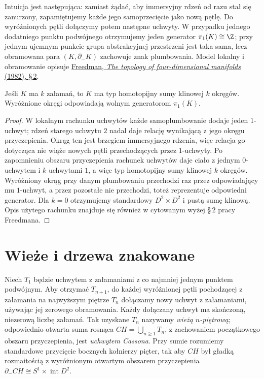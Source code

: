 Intuicja jest następująca: zamiast żądać, aby
immersyjny rdzeń od razu stał się zanurzony, zapamiętujemy
każde jego samoprzecięcie jako nową pętlę. Do
wyróżnionych pętli dołączymy potem następne uchwyty.
W przypadku jednego dodatniego punktu podwójnego
otrzymujemy jeden generator $\pi_1(K)\cong\Z$;
przy jednym ujemnym punkcie grupa abstrakcyjnej
przestrzeni jest taka sama, lecz obramowana para
$(K,\partial_-K)$ zachowuje znak plumbowania.
Model lokalny i obramowanie opisuje
\href{https://www.maths.gla.ac.uk/~mpowell/1982_The%20topology%20of%20four-dimensional%20manifolds.pdf}
{Freedman, \emph{The topology of four-dimensional manifolds}
(1982), \S\,2}.

\begin{stwierdzenie}
\label{prop:casson-first-pi1}
Jeśli $K$ ma $k$ załamań, to $K$ ma typ homotopijny
sumy klinowej $k$ okręgów. Wyróżnione okręgi
odpowiadają wolnym generatorom $\pi_1(K)$.
\end{stwierdzenie}
\begin{proof}
W lokalnym rachunku uchwytów każde
samoplumbowanie dodaje jeden $1$-uchwyt; rdzeń starego
uchwytu $2$ nadal daje relację wynikającą z jego
okręgu przyczepienia. Okrąg ten jest brzegiem
immersyjnego rdzenia, więc relacja go dotycząca
nie wiąże nowych pętli przechodzących przez
$1$-uchwyty. Po zapomnieniu obszaru przyczepienia
rachunek uchwytów daje ciało z jednym $0$-uchwytem
i $k$ uchwytami $1$, a więc typ homotopijny sumy
klinowej $k$ okręgów.
Wyróżniony okrąg przy danym plumbowaniu przechodzi
raz przez odpowiadający mu $1$-uchwyt, a przez
pozostałe nie przechodzi, toteż reprezentuje
odpowiedni generator. Dla $k=0$ otrzymujemy
standardowy $D^2\times D^2$ i pustą sumę klinową.
Opis użytego rachunku znajduje się również w
cytowanym wyżej \S\,2 pracy Freedmana.
\end{proof}

\section{Wieże i drzewa znakowane}
\label{sec:casson-tower}

\begin{definicja}
\label{def:casson-handle}
Niech $T_1$ będzie uchwytem z załamaniami z co
najmniej jednym punktem podwójnym. Aby otrzymać
$T_{n+1}$, do każdej wyróżnionej pętli pochodzącej
z załamania na najwyższym piętrze $T_n$ dołączamy
nowy uchwyt z załamaniami, używając jej zerowego
obramowania. Każdy dołączany uchwyt ma skończoną,
niezerową liczbę załamań. Tak uzyskane $T_n$ nazywamy
\emph{wieżą $n$-piętrową}; odpowiednio otwarta suma
rosnąca $CH=\bigcup_{n\geq1}T_n$, z zachowaniem
początkowego obszaru przyczepienia, jest
\emph{uchwytem Cassona}. Przy sumie rozumiemy
standardowe przycięcie bocznych kołnierzy pięter,
tak aby $CH$ był gładką rozmaitością z wyróżnionym
otwartym obszarem przyczepienia
$\partial_-CH\cong S^1\times\operatorname{int}D^2$.
\end{definicja}

